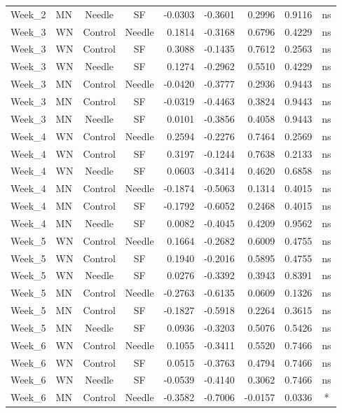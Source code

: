 \documentclass[
  12pt,
  letterpaper,
]{article}
\begin{document}
\begin{longtable}{llccrrrlc}
Week\_2 & MN & Needle & SF & -0.0303 & -0.3601 & 0.2996 & 0.9116 & ns \\ 
Week\_3 & WN & Control & Needle & 0.1814 & -0.3168 & 0.6796 & 0.4229 & ns \\ 
Week\_3 & WN & Control & SF & 0.3088 & -0.1435 & 0.7612 & 0.2563 & ns \\ 
Week\_3 & WN & Needle & SF & 0.1274 & -0.2962 & 0.5510 & 0.4229 & ns \\ 
Week\_3 & MN & Control & Needle & -0.0420 & -0.3777 & 0.2936 & 0.9443 & ns \\ 
Week\_3 & MN & Control & SF & -0.0319 & -0.4463 & 0.3824 & 0.9443 & ns \\ 
Week\_3 & MN & Needle & SF & 0.0101 & -0.3856 & 0.4058 & 0.9443 & ns \\ 
Week\_4 & WN & Control & Needle & 0.2594 & -0.2276 & 0.7464 & 0.2569 & ns \\ 
Week\_4 & WN & Control & SF & 0.3197 & -0.1244 & 0.7638 & 0.2133 & ns \\ 
Week\_4 & WN & Needle & SF & 0.0603 & -0.3414 & 0.4620 & 0.6858 & ns \\ 
Week\_4 & MN & Control & Needle & -0.1874 & -0.5063 & 0.1314 & 0.4015 & ns \\ 
Week\_4 & MN & Control & SF & -0.1792 & -0.6052 & 0.2468 & 0.4015 & ns \\ 
Week\_4 & MN & Needle & SF & 0.0082 & -0.4045 & 0.4209 & 0.9562 & ns \\ 
Week\_5 & WN & Control & Needle & 0.1664 & -0.2682 & 0.6009 & 0.4755 & ns \\ 
Week\_5 & WN & Control & SF & 0.1940 & -0.2016 & 0.5895 & 0.4755 & ns \\ 
Week\_5 & WN & Needle & SF & 0.0276 & -0.3392 & 0.3943 & 0.8391 & ns \\ 
Week\_5 & MN & Control & Needle & -0.2763 & -0.6135 & 0.0609 & 0.1326 & ns \\ 
Week\_5 & MN & Control & SF & -0.1827 & -0.5918 & 0.2264 & 0.3615 & ns \\ 
Week\_5 & MN & Needle & SF & 0.0936 & -0.3203 & 0.5076 & 0.5426 & ns \\ 
Week\_6 & WN & Control & Needle & 0.1055 & -0.3411 & 0.5520 & 0.7466 & ns \\ 
Week\_6 & WN & Control & SF & 0.0515 & -0.3763 & 0.4794 & 0.7466 & ns \\ 
Week\_6 & WN & Needle & SF & -0.0539 & -0.4140 & 0.3062 & 0.7466 & ns \\ 
Week\_6 & MN & Control & Needle & -0.3582 & -0.7006 & -0.0157 & 0.0336 & * \\ 

\end{longtable}
\end{document}
